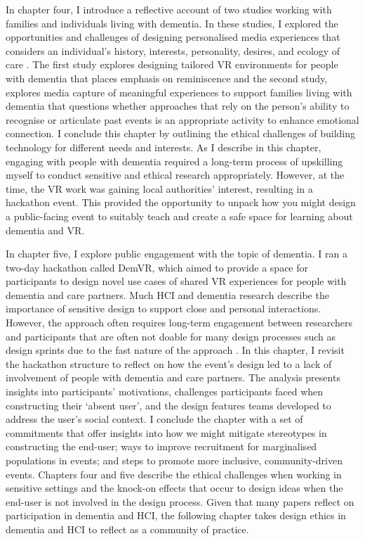 In chapter four, I introduce a reflective account of two studies working with families and individuals living with dementia. In these studies, I explored the opportunities and challenges of designing personalised media experiences that considers an individual's history, interests, personality, desires, and ecology of care \citep{ryan_dementia_2009}. The first study explores designing tailored VR environments for people with dementia that places emphasis on reminiscence and the second study, explores media capture of meaningful experiences to support families living with dementia that questions whether approaches that rely on the person's ability to recognise or articulate past events is an appropriate activity to enhance emotional connection. I conclude this chapter by outlining the ethical challenges of building technology for different needs and interests. As I describe in this chapter, engaging with people with dementia required a long-term process of upskilling myself to conduct sensitive and ethical research appropriately. However, at the time, the VR work was gaining local authorities' interest, resulting in a hackathon event. This provided the opportunity to unpack how you might design a public-facing event to suitably teach and create a safe space for learning about dementia and VR.

In chapter five, I explore public engagement with the topic of dementia. I ran a two-day hackathon called DemVR, which aimed to provide a space for participants to design novel use cases of shared VR experiences for people with dementia and care partners. Much HCI and dementia research describe the importance of sensitive design to support close and personal interactions. However, the approach often requires long-term engagement between researchers and participants that are often not doable for many design processes such as design sprints due to the fast nature of the approach \citep{braybrooke2021care}. In this chapter, I revisit the hackathon structure to reflect on how the event's design led to a lack of involvement of people with dementia and care partners. The analysis presents insights into participants' motivations, challenges participants faced when constructing their `absent user', and the design features teams developed to address the user's social context. I conclude the chapter with a set of commitments that offer insights into how we might mitigate stereotypes in constructing the end-user; ways to improve recruitment for marginalised populations in events; and steps to promote more inclusive, community-driven events. Chapters four and five describe the ethical challenges when working in sensitive settings and the knock-on effects that occur to design ideas when the end-user is not involved in the design process. Given that many papers reflect on participation in dementia and HCI, the following chapter takes design ethics in dementia and HCI to reflect as a community of practice.

